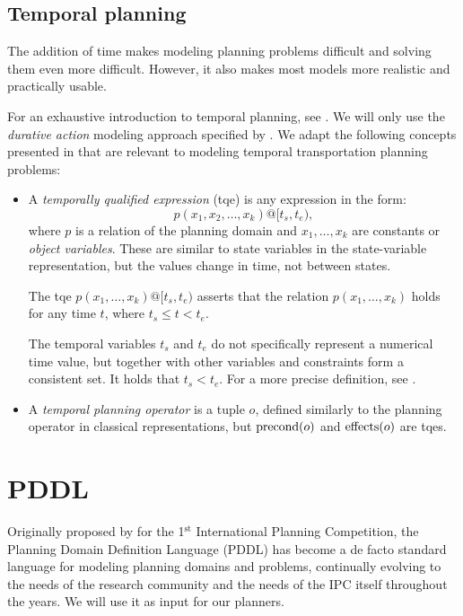 \subsection{Temporal planning}

The addition of time makes modeling planning problems difficult and
solving them even more difficult.
However, it also makes most models more realistic and practically usable.

For an exhaustive introduction to temporal planning, see \citet[Chapter~13~and~14]{Ghallab2004}. We will only use the \textit{durative action} modeling approach
specified by \citet[Section~5]{Fox2003}. We adapt the following concepts presented
in \citet[Section~14.2]{Ghallab2004} that are relevant to modeling temporal transportation planning problems:
\begin{itemize}
\item A \textit{temporally qualified expression} (tqe) is any
expression in the form: $$p(x_1, x_2, \ldots, x_k)@[t_s, t_e),$$ where $p$
is a relation of the planning domain and $x_1, \ldots, x_k$ are constants or \textit{object
variables}. These are similar to state variables in the state-variable representation,
but the values change in time, not between states.

The tqe $p(x_1, \ldots, x_k)@[t_s, t_e)$
asserts that the relation $p(x_1, \ldots, x_k)$ holds for any time $t$, where
$t_s \leq t < t_e$.

The temporal variables $t_s$ and $t_e$ do not specifically represent a numerical time value, but together with other variables and constraints form a consistent set.
It holds that $t_s < t_e$. For a more precise definition, see \citet[Section~14.2.1]{Ghallab2004}.


\item A \textit{temporal planning operator} is a tuple $o$, defined similarly to the planning operator in classical representations, but $\operatorname{\textrm{precond}}(o)$ and $\operatorname{\textrm{effects}}(o)$ are tqes.
\end{itemize}













\section{PDDL}\label{pddl}

Originally proposed by \citet{McDermott1998} for the 1$^{\mathrm{st}}$ International Planning
Competition,
the Planning Domain Definition Language (PDDL) has become
a de facto standard language for modeling planning domains and problems,
continually evolving to the needs of the  
research community and the needs of the IPC itself throughout the years.
We will use it as input for our planners.

